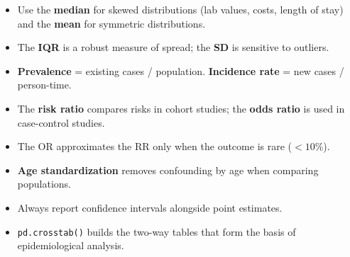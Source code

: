 \begin{itemize}
  \item Use the \textbf{median} for skewed distributions (lab values, costs, length of stay) and the \textbf{mean} for symmetric distributions.
  \item The \textbf{IQR} is a robust measure of spread; the \textbf{SD} is sensitive to outliers.
  \item \textbf{Prevalence} = existing cases / population. \textbf{Incidence rate} = new cases / person-time.
  \item The \textbf{risk ratio} compares risks in cohort studies; the \textbf{odds ratio} is used in case-control studies.
  \item The OR approximates the RR only when the outcome is rare ($<10\%$).
  \item \textbf{Age standardization} removes confounding by age when comparing populations.
  \item Always report confidence intervals alongside point estimates.
  \item \texttt{pd.crosstab()} builds the two-way tables that form the basis of epidemiological analysis.
\end{itemize}
